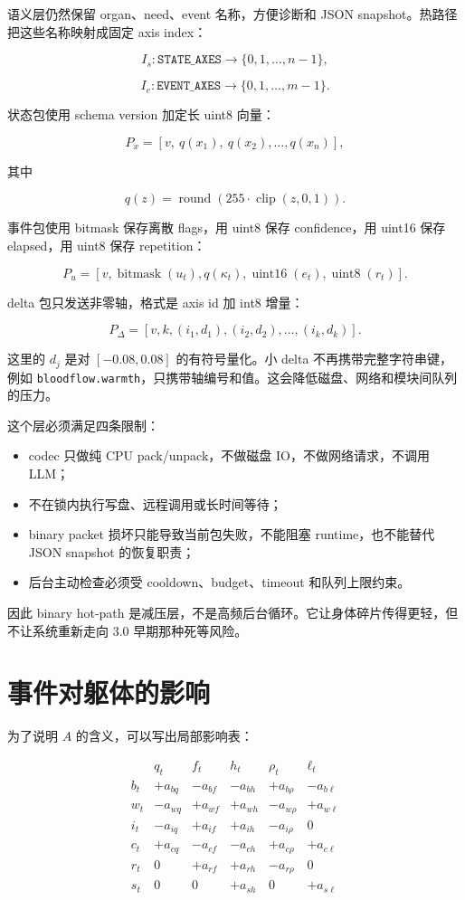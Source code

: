 \documentclass[UTF8,12pt]{ctexart}
\begin{document}
语义层仍然保留 organ、need、event 名称，方便诊断和 JSON snapshot。热路径把这些名称映射成固定 axis index：

\[
I_s:\texttt{STATE\_AXES}\rightarrow\{0,1,\ldots,n-1\},
\]

\[
I_e:\texttt{EVENT\_AXES}\rightarrow\{0,1,\ldots,m-1\}.
\]

状态包使用 schema version 加定长 uint8 向量：

\[
P_x=\left[v,\ q(x_1),\ q(x_2),\ldots,q(x_n)\right],
\]

其中

\[
q(z)=\operatorname{round}(255\cdot\operatorname{clip}(z,0,1)).
\]

事件包使用 bitmask 保存离散 flags，用 uint8 保存 confidence，用 uint16 保存 elapsed，用 uint8 保存 repetition：

\[
P_u=\left[v,\operatorname{bitmask}(u_t),q(\kappa_t),\operatorname{uint16}(e_t),\operatorname{uint8}(r_t)\right].
\]

delta 包只发送非零轴，格式是 axis id 加 int8 增量：

\[
P_{\Delta}=\left[v,k,(i_1,d_1),(i_2,d_2),\ldots,(i_k,d_k)\right].
\]

这里的 $d_j$ 是对 $[-0.08,0.08]$ 的有符号量化。小 delta 不再携带完整字符串键，例如 \texttt{bloodflow.warmth}，只携带轴编号和值。这会降低磁盘、网络和模块间队列的压力。

这个层必须满足四条限制：

\begin{itemize}
  \item codec 只做纯 CPU pack/unpack，不做磁盘 IO，不做网络请求，不调用 LLM；
  \item 不在锁内执行写盘、远程调用或长时间等待；
  \item binary packet 损坏只能导致当前包失败，不能阻塞 runtime，也不能替代 JSON snapshot 的恢复职责；
  \item 后台主动检查必须受 cooldown、budget、timeout 和队列上限约束。
\end{itemize}

因此 binary hot-path 是减压层，不是高频后台循环。它让身体碎片传得更轻，但不让系统重新走向 3.0 早期那种死等风险。

\section{事件对躯体的影响}

为了说明 $A$ 的含义，可以写出局部影响表：

\[
\begin{array}{c|rrrrr}
 & q_t & f_t & h_t & \rho_t & \ell_t \\
\hline
b_t & +a_{bq} & -a_{bf} & -a_{bh} & +a_{b\rho} & -a_{b\ell} \\
w_t & -a_{wq} & +a_{wf} & +a_{wh} & -a_{w\rho} & +a_{w\ell} \\
i_t & -a_{iq} & +a_{if} & +a_{ih} & -a_{i\rho} & 0 \\
c_t & +a_{cq} & -a_{cf} & -a_{ch} & +a_{c\rho} & +a_{c\ell} \\
r_t & 0 & +a_{rf} & +a_{rh} & -a_{r\rho} & 0 \\
s_t & 0 & 0 & +a_{sh} & 0 & +a_{s\ell}
\end{array}
\]
\end{document}
